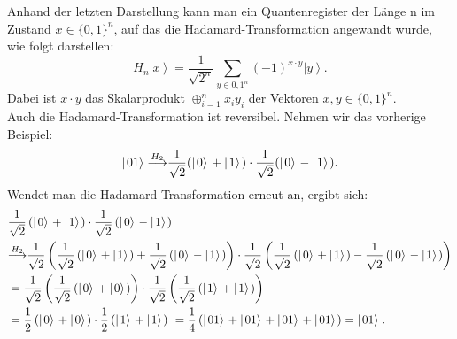 Anhand der letzten Darstellung kann man ein Quantenregister der Länge n im Zustand
$x\in{\{0,1\}}^n$, auf das die Hadamard-Transformation angewandt wurde, wie folgt darstellen:
\begin{equation}
    H_n\left|\left.x\right\rangle\right.=\frac{1}{\sqrt{2^n}}\sum_{y\in{0,1}^n}\left(-1\right)^{x\cdot y}\left|\left.y\right\rangle\right..
\end{equation}
Dabei ist $x\cdot y$ das Skalarprodukt $\oplus_{i=1}^nx_iy_i$ der Vektoren $x,y\in{\{0,1\}}^n$. \\
Auch die Hadamard-Transformation ist reversibel. Nehmen wir das vorherige Beispiel:
\begin{equation}
    \left|\left.01\right\rangle\right.{\buildrel H_2\over\longrightarrow}\frac{1}{\sqrt2}(\left|\left.0\right\rangle\right.+\left|\left.1\right\rangle\right.)\cdot\frac{1}{\sqrt2}(\left|\left.0\right\rangle\right.-\left|\left.1\right\rangle\right.).
\end{equation}
Wendet man die Hadamard-Transformation erneut an, ergibt sich:
\begin{equation}
    \begin{aligned}
    &\frac{1}{\sqrt2}\left(\left|\left.0\right\rangle\right.+\left|\left.1\right\rangle\right.\right)\cdot\frac{1}{\sqrt2}\left(\left|\left.0\right\rangle\right.-\left|\left.1\right\rangle\right.\right)\\
    &{\buildrel H_2\over\longrightarrow}\frac{1}{\sqrt2}\left(\frac{1}{\sqrt2}\left(\left|\left.0\right\rangle\right.+\left|\left.1\right\rangle\right.\right)+\frac{1}{\sqrt2}\left(\left|\left.0\right\rangle\right.-\left|\left.1\right\rangle\right.\right)\right)\cdot\frac{1}{\sqrt2}\left(\frac{1}{\sqrt2}\left(\left|\left.0\right\rangle\right.+\left|\left.1\right\rangle\right.\right)-\frac{1}{\sqrt2}\left(\left|\left.0\right\rangle\right.-\left|\left.1\right\rangle\right.\right)\right)\\
    &=\frac{1}{\sqrt2}\left(\frac{1}{\sqrt2}\left(\left|\left.0\right\rangle\right.+\left|\left.0\right\rangle\right.\right)\right)\cdot\frac{1}{\sqrt2}\left(\frac{1}{\sqrt2}\left(\left|\left.1\right\rangle\right.+\left|\left.1\right\rangle\right.\right)\right)\\
    &=\frac{1}{2}\left(\left|\left.0\right\rangle\right.+\left|\left.0\right\rangle\right.\right)\cdot\frac{1}{2}\left(\left|\left.1\right\rangle\right.+\left|\left.1\right\rangle\right.\right)\ =\frac{1}{4}\left(\left|\left.01\right\rangle\right.+\left|\left.01\right\rangle\right.+\left|\left.01\right\rangle\right.+\left|\left.01\right\rangle\right.\right)=\left|\left.01\right\rangle\right..
\end{aligned}
\end{equation}

